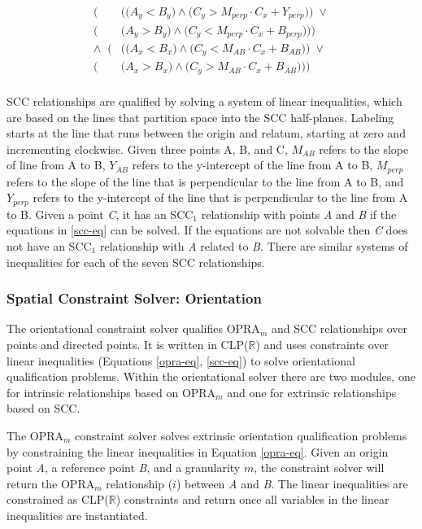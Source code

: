 \documentclass[12pt]{ucthesis}
\begin{document}
\begin{equation}\label{scc-eq} 
\begin{aligned}
\Big(&\Big(\Big(A_{y} < B_{y}\Big) \wedge \Big(C_{y} > M_{perp} \cdot C_{x} + Y_{perp}\Big)\Big) \; \lor \\
\Big(&\Big(A_{y} > B_{y}\Big) \wedge \Big(C_{y} < M_{perp} \cdot C_{x} + B_{perp}\Big)\Big)\Big) \\
\wedge \;\; \Big(&\Big(\Big(A_{x} < B_{x}\Big) \wedge \Big(C_{y} < M_{AB} \cdot C_{x} + B_{AB}\Big)\Big) \; \lor \\
\Big(&\Big(A_{x} > B_{x}\Big) \wedge \Big(C_{y} > M_{AB} \cdot C_{x} + B_{AB}\Big)\Big)\Big) \\
\end{aligned}
\end{equation}

SCC relationships are qualified by solving a system of linear inequalities, which are based on the lines that partition space into the SCC half-planes. Labeling starts at the line that runs between the origin and relatum, starting at zero and incrementing clockwise. Given three points A, B, and C, $M_{AB}$ refers to the slope of line from A to B, $Y_{AB}$ refers to the y-intercept of the line from A to B, $M_{perp}$ refers to the slope of the line that is perpendicular to the line from A to B, and $Y_{perp}$ refers to the y-intercept of the line that is perpendicular to the line from A to B. Given a point \emph{C}, it has an SCC$_{1}$ relationship with points \emph{A} and \emph{B} if the equations in \ref{scc-eq} can be solved. If the equations are not solvable then \emph{C} does not have an SCC$_{1}$ relationship with \emph{A} related to \emph{B}. There are similar systems of inequalities for each of the seven SCC relationships.  


\subsubsection{Spatial Constraint Solver: Orientation}
The orientational constraint solver qualifies OPRA$_{m}$ and SCC relationships over points and directed points. It is written in CLP($\mathbb{R}$) and uses constraints over linear inequalities (Equations \ref{opra-eq}, \ref{scc-eq}) to solve orientational qualification problems. Within the orientational solver there are two modules, one for intrinsic relationships based on OPRA$_{m}$ and one for extrinsic relationships based on SCC.

The OPRA$_{m}$ constraint solver solves extrinsic orientation qualification problems by constraining the linear inequalities in Equation \ref{opra-eq}. Given an origin point \emph{A}, a reference point \emph{B}, and a granularity $m$, the constraint solver will return the OPRA$_{m}$ relationship ($i$) between \emph{A} and \emph{B}. The linear inequalities are constrained as CLP($\mathbb{R}$) constraints and return once all variables in the linear inequalities are instantiated. 
\end{document}
